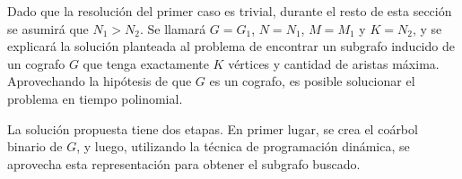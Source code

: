 Dado que la resolución del primer caso es trivial, durante el resto de esta
sección se asumirá que $N_1 > N_2$. Se llamará $G = G_1$, $N = N_1$, $M = M_1$
y $K = N_2$, y se explicará la solución planteada al problema de encontrar un
subgrafo inducido de un cografo $G$ que tenga exactamente $K$ vértices y
cantidad de aristas máxima. Aprovechando la hipótesis de que $G$ es un
cografo, es posible solucionar el problema en tiempo polinomial.

La solución propuesta tiene dos etapas. En primer lugar, se crea el coárbol
binario de $G$, y luego, utilizando la técnica de programación dinámica, se
aprovecha esta representación para obtener el subgrafo buscado.

